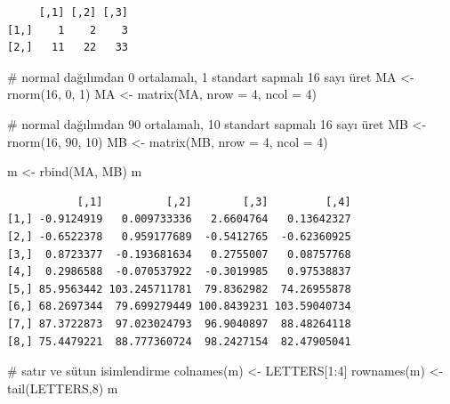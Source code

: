 \documentclass[
  letterpaper,
  DIV=11,
  numbers=noendperiod]{scrreprt}
\newenvironment{Shaded}{\begin{snugshade}}{\end{snugshade}}
\newcommand{\AttributeTok}[1]{\textcolor[rgb]{0.40,0.45,0.13}{#1}}
\newcommand{\CommentTok}[1]{\textcolor[rgb]{0.37,0.37,0.37}{#1}}
\newcommand{\DecValTok}[1]{\textcolor[rgb]{0.68,0.00,0.00}{#1}}
\newcommand{\FunctionTok}[1]{\textcolor[rgb]{0.28,0.35,0.67}{#1}}
\newcommand{\NormalTok}[1]{\textcolor[rgb]{0.00,0.23,0.31}{#1}}
\newcommand{\OtherTok}[1]{\textcolor[rgb]{0.00,0.23,0.31}{#1}}
\newcommand{\SpecialCharTok}[1]{\textcolor[rgb]{0.37,0.37,0.37}{#1}}
\begin{document}
\begin{verbatim}
     [,1] [,2] [,3]
[1,]    1    2    3
[2,]   11   22   33
\end{verbatim}

\begin{Shaded}
\begin{Highlighting}[]
\CommentTok{\# normal dağılımdan 0 ortalamalı, 1 standart sapmalı 16 sayı üret}
\NormalTok{MA }\OtherTok{\textless{}{-}} \FunctionTok{rnorm}\NormalTok{(}\DecValTok{16}\NormalTok{, }\DecValTok{0}\NormalTok{, }\DecValTok{1}\NormalTok{)}
\NormalTok{MA }\OtherTok{\textless{}{-}} \FunctionTok{matrix}\NormalTok{(MA, }\AttributeTok{nrow =} \DecValTok{4}\NormalTok{, }\AttributeTok{ncol =} \DecValTok{4}\NormalTok{)}

\CommentTok{\# normal dağılımdan 90 ortalamalı, 10 standart sapmalı 16 sayı üret}
\NormalTok{MB }\OtherTok{\textless{}{-}} \FunctionTok{rnorm}\NormalTok{(}\DecValTok{16}\NormalTok{, }\DecValTok{90}\NormalTok{, }\DecValTok{10}\NormalTok{)}
\NormalTok{MB }\OtherTok{\textless{}{-}} \FunctionTok{matrix}\NormalTok{(MB, }\AttributeTok{nrow =} \DecValTok{4}\NormalTok{, }\AttributeTok{ncol =} \DecValTok{4}\NormalTok{)}

\NormalTok{m }\OtherTok{\textless{}{-}} \FunctionTok{rbind}\NormalTok{(MA, MB)}
\NormalTok{m}
\end{Highlighting}
\end{Shaded}

\begin{verbatim}
           [,1]          [,2]        [,3]         [,4]
[1,] -0.9124919   0.009733336   2.6604764   0.13642327
[2,] -0.6522378   0.959177689  -0.5412765  -0.62360925
[3,]  0.8723377  -0.193681634   0.2755007   0.08757768
[4,]  0.2986588  -0.070537922  -0.3019985   0.97538837
[5,] 85.9563442 103.245711781  79.8362982  74.26955878
[6,] 68.2697344  79.699279449 100.8439231 103.59040734
[7,] 87.3722873  97.023024793  96.9040897  88.48264118
[8,] 75.4479221  88.777360724  98.2427154  82.47905041
\end{verbatim}

\begin{Shaded}
\begin{Highlighting}[]
\CommentTok{\# satır ve sütun isimlendirme}
\FunctionTok{colnames}\NormalTok{(m) }\OtherTok{\textless{}{-}}\NormalTok{ LETTERS[}\DecValTok{1}\SpecialCharTok{:}\DecValTok{4}\NormalTok{]}
\FunctionTok{rownames}\NormalTok{(m) }\OtherTok{\textless{}{-}} \FunctionTok{tail}\NormalTok{(LETTERS,}\DecValTok{8}\NormalTok{)}
\NormalTok{m}
\end{Highlighting}
\end{Shaded}
\end{document}
